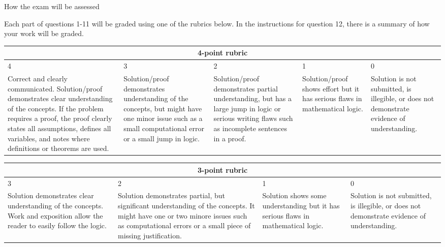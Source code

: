 \documentclass[11pt,addpoints,letterpaper]{exam}
\begin{document}
\newpage
\begin{center}
\large
How the exam will be assessed
\end{center}
Each part of questions 1-11 will be graded using one of the rubrics below. In the instructions for question 12, there is a summary of how your work will be graded.
\begin{center}
\begin{tabular}{|p{3.5cm}|p{2.7cm}|p{2.7cm}|p{2.5cm}|p{2.8cm}|}
\hline \multicolumn{5}{|c|}{4-point rubric}\\ \hline
4 & 3 & 2 &1 & 0\\ \hline
Correct and clearly communicated. Solution/proof demonstrates clear understanding of the concepts. If the problem requires a proof, the proof clearly states all assumptions, defines all variables, and notes where definitions or theorems are used. & Solution/proof demonstrates understanding of the concepts, but might have one minor issue such as a small computational error or a small jump in logic.  & Solution/proof demonstrates partial understanding, but has a large jump in logic or serious writing flaws such as incomplete sentences in a proof.  & Solution/proof shows effort but it has serious flaws in mathematical logic.  &Solution is not submitted, is illegible, or does not demonstrate evidence of understanding. \\ \hline
\end{tabular}
\begin{tabular}{|p{3.5cm}|p{2.7cm}|p{2.8cm}|p{2.5cm}|}
\hline \multicolumn{4}{|c|}{3-point rubric}\\ \hline
 3 & 2 &1 & 0\\ \hline
Solution demonstrates clear understanding of the concepts. Work and exposition allow the reader to easily follow the logic. & Solution demonstrates partial, but significant understanding of the concepts. It might have one or two minore issues such as computational errors or a small piece of missing justification. & Solution shows some understanding but it has serious flaws in mathematical logic.  &Solution is not submitted, is illegible, or does not demonstrate evidence of understanding. \\ \hline
\end{tabular}
\end{center}
\end{document}
